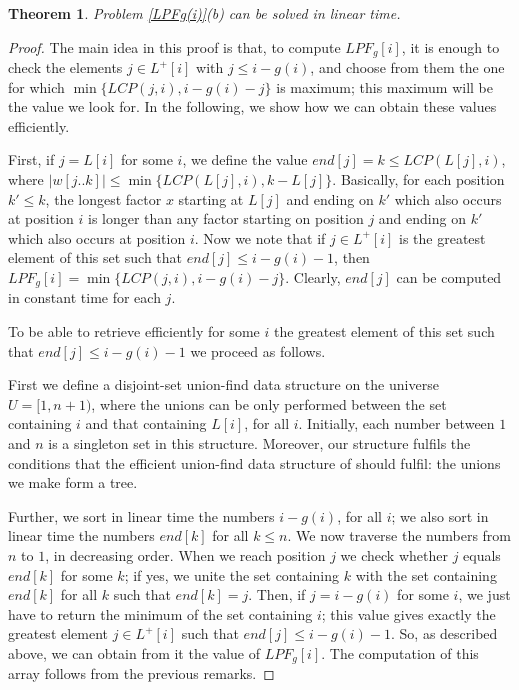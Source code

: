 \documentclass[final]{dmtcs-episciences}
\newcommand{\LCP}{{\mathit{LCP}}}
\newcommand{\LPdF}{{\mathit{LPF}}}
\newtheorem{theorem}{Theorem}
\begin{document}
\begin{theorem}\label{LPFg(i)_sol_rep}
Problem \ref{LPFg(i)}(b) can be solved in linear time.
\end{theorem}
\begin{proof}
The main idea in this proof is that, to compute $\LPdF_g[i]$, it is enough to check the elements $j\in L^+[i]$ with $j\leq i-g(i)$, and choose from them the one for which $\min\{\LCP(j,i), i-g(i) -j\}$ is maximum; this maximum will be the value we look for. In the following, we show how we can obtain these values efficiently.

First, if $j=L[i]$ for some $i$, we define the value $end[j]=k\leq \LCP(L[j],i)$, where $|w[j..k]|\leq \min\{\LCP(L[j],i), k -L[j]\}$. Basically, for each position $k'\leq k$, the longest factor $x$ starting at $L[j]$ and ending on $k'$ which also occurs at position $i$ is longer than any factor starting on position $j$ and ending on $k'$ which also occurs at position $i$. Now we note that if $j\in L^+[i]$ is the greatest element of this set such that $end[j]\leq i-g(i)-1$, then $\LPdF_g[i]=\min\{\LCP(j,i), i-g(i) - j\}$. Clearly, $end[j]$ can be computed in constant time for each $j$.

To be able to retrieve efficiently for some $i$ the greatest element of this set such that $end[j]\leq i-g(i)-1$ we proceed as follows.

First we define a disjoint-set union-find data structure on the universe $U=[1,n+1)$, where the unions can be only performed between the set containing $i$ and that containing $L[i]$, for all $i$. Initially, each number between $1$ and $n$ is a singleton set in this structure. Moreover, our structure fulfils the conditions that the efficient union-find data structure of \cite{Gabow83} should fulfil: the unions we make form a tree. 

Further, we sort in linear time the numbers $i-g(i)$, for all $i$; we also sort in linear time the numbers $end[k]$ for all $k\leq n$. We now traverse the numbers from $n$ to $1$, in decreasing order. When we reach position $j$ we check whether $j$ equals $end[k]$ for some $k$; if yes, we unite the set containing $k$ with the set containing $end[k]$ for all $k$ such that $end[k]=j$. Then, if $j=i-g(i)$ for some $i$, we just have to return the minimum of the set containing $i$; this value gives exactly 
the greatest element $j\in L^+[i]$ such that $end[j]\leq i-g(i)-1$. So, as described above, we can obtain from it the value of $\LPdF_g[i]$.  The computation of this array follows from the previous remarks.


\end{proof}
\end{document}
